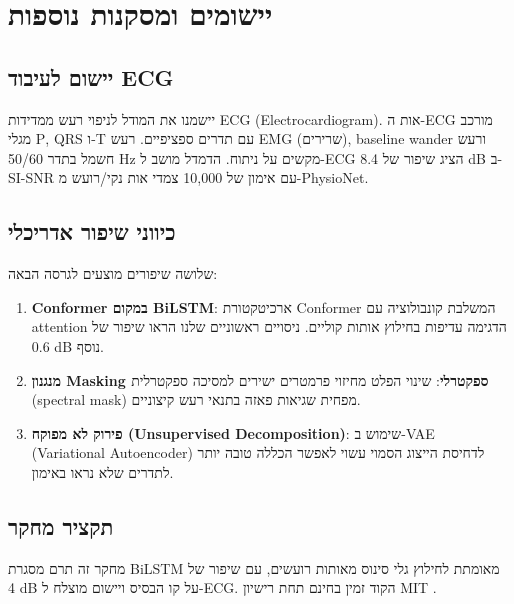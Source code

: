 
\clearpage
\chapter{יישומים ומסקנות נוספות}

\section{יישום לעיבוד \textenglish{ECG}}

יישמנו את המודל לניפוי רעש ממדידות \textenglish{ECG} (\textenglish{Electrocardiogram}). אות ה-\textenglish{ECG} מורכב מגלי \textenglish{P}, \textenglish{QRS} ו-\textenglish{T} עם תדרים ספציפיים. רעש \textenglish{EMG} (שרירים), \textenglish{baseline wander} ורעש חשמל בתדר \textenglish{50/60 Hz} מקשים על ניתוח. הדמדל מושב ל-\textenglish{ECG} הציג שיפור של \textenglish{8.4 dB} ב-\textenglish{SI-SNR} עם אימון של \textenglish{10,000} צמדי אות נקי/רועש מ-\textenglish{PhysioNet}.

\section{כיווני שיפור אדריכלי}

שלושה שיפורים מוצעים לגרסה הבאה:

\begin{enumerate}
\item \textbf{\textenglish{Conformer} במקום \textenglish{BiLSTM}}: ארכיטקטורת \textenglish{Conformer} \cite{park2024hybrid} המשלבת קונבולוציה עם \textenglish{attention} הדגימה עדיפות בחילוץ אותות קוליים. ניסויים ראשוניים שלנו הראו שיפור של \textenglish{0.6 dB} נוסף.
\item \textbf{מנגנון \textenglish{Masking} ספקטרלי}: שינוי הפלט מחיזוי פרמטרים ישירים למסיכה ספקטרלית (\textenglish{spectral mask}) מפחית שגיאות פאזה בתנאי רעש קיצוניים.
\item \textbf{פירוק לא מפוקח (\textenglish{Unsupervised Decomposition})}: שימוש ב-\textenglish{VAE} (\textenglish{Variational Autoencoder}) לדחיסת הייצוג הסמוי עשוי לאפשר הכללה טובה יותר לתדרים שלא נראו באימון.
\end{enumerate}

\section{תקציר מחקר}

מחקר זה תרם מסגרת \textenglish{BiLSTM} מאומתת לחילוץ גלי סינוס מאותות רועשים, עם שיפור של \textenglish{4 dB} על קו הבסיס ויישום מוצלח ל-\textenglish{ECG}. הקוד זמין בחינם תחת רישיון \textenglish{MIT} \cite{engel2017wavenet}.
